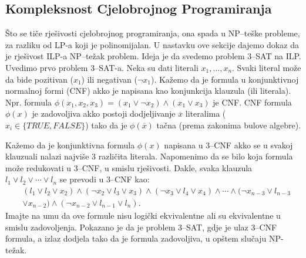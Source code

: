 \documentclass[a4paper, utf8, 11pt, colorlinks]{article}
\begin{document}
 \subsection{Kompleksnost Cjelobrojnog Programiranja}
   Što se tiče rješivosti cjelobrojnog programiranja, ona spada u NP--teške probleme, za razliku od LP-a koji je polinomijalan. U nastavku ove sekcije dajemo dokaz da je rješivost ILP-a NP--težak problem.  Ideja je da  svedemo problem 3--SAT na ILP.\\ 
   Uvedimo prvo problem 3--SAT-a. Neka su dati literali $x_1, \ldots, x_n$. Svaki literal može da bide pozitivan ($x_1$) ili negativan  ($\neg x_1$). Kažemo da je formula u konjunktivnoj normalnoj formi (CNF) akko je napisana kao konjunkcija klauzula (ili literala). Npr. formula $\phi(x_1, x_2, x_3)= (x_1 \vee  \neg x_2) \wedge (x_1 \vee x_3)$ je CNF. CNF formula $\phi(x)$ je zadovoljiva akko postoji dodjeljivanje $\overline{x}$ literalima ($x_i \in \{TRUE, FALSE\}$) tako da je $\phi(\overline{x})$ tačna (prema zakonima bulove algebre).  
   
   Kažemo da je konjunktivna formula $\phi(x)$  napisana u 3--CNF  akko se u svakoj klauzuali nalazi najviše 3 različita literala. Napomenimo da se bilo koja formula može redukovati u 3--CNF, u smislu rješivosti. Dakle, svaka klauzula 
   $l_1 \vee l_2 \vee \cdots \vee l_n$ se prevodi u 3--CNF kao:
   \begin{align*}
       &(l_1 \vee l_2 \vee x_2) \wedge ( \neg x_2 \vee l_3 \vee x_3) \wedge ( \neg x_3 \vee l_4 \vee x_4 ) \wedge \cdots \wedge (\neg x_{n-3} \vee l_{n-3} \\
       &\vee x_{n-2} ) \wedge ( \neg x_{n-2} \vee l_{n-1} \vee l_n ).  
    \end{align*}    
      Imajte na umu da ove formule nisu logički ekvivalentne ali su ekvivalentne u smislu zadovoljenja. 
    Pokazano je da je problem 3--SAT, gdje je ulaz 3--CNF formula, a izlaz dodjela tako da je formula zadovoljiva, u opštem slučaju NP-težak.  
    
\end{document}
